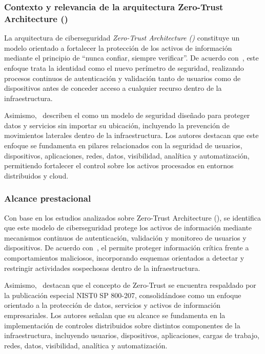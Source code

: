 \subsubsection{Contexto y relevancia de la arquitectura Zero-Trust Architecture (\ZTA)}

La arquitectura de ciberseguridad \textit{Zero-Trust Architecture (\ZTA)} constituye un modelo orientado a fortalecer la protección de los 
activos de información mediante el principio de ``nunca confiar, siempre verificar''. De acuerdo con~\cite{ali2025zta}, este enfoque trata 
la identidad como el nuevo perímetro de seguridad, realizando procesos continuos de autenticación y validación tanto de usuarios como de 
dispositivos antes de conceder acceso a cualquier recurso dentro de la infraestructura.

Asimismo,~\cite{stojalowski2024zero} describen el \ZTA como un modelo de seguridad diseñado para proteger datos y servicios sin importar su 
ubicación, incluyendo la prevención de movimientos laterales dentro de la infraestructura. Los autores destacan que este enfoque se 
fundamenta en pilares relacionados con la seguridad de usuarios, dispositivos, aplicaciones, redes, datos, visibilidad, analítica y 
automatización, permitiendo fortalecer el control sobre los activos procesados en entornos distribuidos y cloud.

\subsubsection{Alcance prestacional}

Con base en los estudios analizados sobre Zero-Trust Architecture (\ZTA), se identifica que este modelo de ciberseguridad protege los 
activos de información mediante mecanismos continuos de autenticación, validación y monitoreo de usuarios y dispositivos. De acuerdo 
con~\cite{bennaceur2026zero}, el \ZTA permite proteger información crítica frente a comportamientos maliciosos, incorporando esquemas 
orientados a detectar y restringir actividades sospechosas dentro de la infraestructura.

Asimismo,~\cite{stojalowski2024zero} destacan que el concepto de Zero-Trust se encuentra respaldado por la publicación especial NIST0
SP 800-207, consolidándose como un enfoque orientado a la protección de datos, servicios y activos de información empresariales. Los 
autores señalan que su alcance se fundamenta en la implementación de controles distribuidos sobre distintos componentes de la 
infraestructura, incluyendo usuarios, dispositivos, aplicaciones, cargas de trabajo, redes, datos, visibilidad, analítica y automatización.

